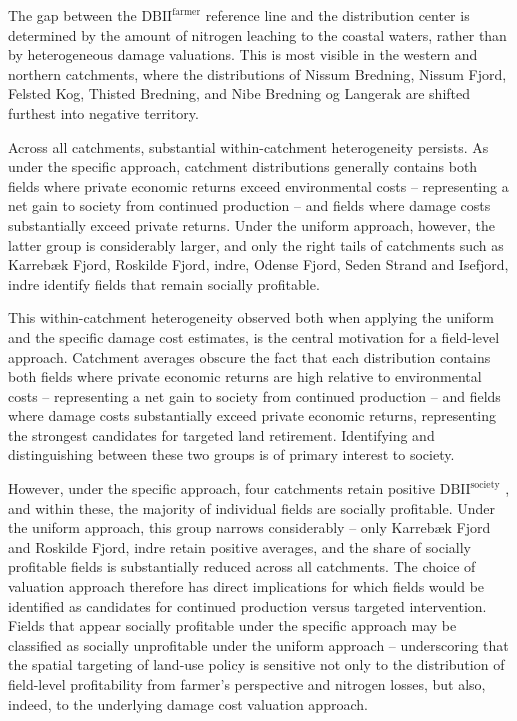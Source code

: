 \documentclass[12pt]{article}
\begin{document}
The gap between the $\mathrm{DBII^{farmer}}$ reference line and the distribution center is determined by the amount of nitrogen leaching to the coastal waters, rather than by heterogeneous damage valuations. This is most visible in the western and northern catchments, where the distributions of Nissum Bredning, Nissum Fjord, Felsted Kog, Thisted Bredning, and Nibe Bredning og Langerak are shifted furthest into negative territory.

Across all catchments, substantial within-catchment heterogeneity persists. 
As under the specific approach, catchment distributions generally contains both fields where private economic returns exceed environmental costs -- representing a net gain to society from continued production -- and fields where damage costs substantially exceed private returns. 
Under the uniform approach, however, the latter group is considerably larger, and only the right tails of catchments such as Karrebæk Fjord, Roskilde Fjord, indre, Odense Fjord, Seden Strand and Isefjord, indre identify fields that remain socially profitable.

This within-catchment heterogeneity observed both when applying the uniform and the specific damage cost estimates, is the central motivation for a field-level approach. Catchment averages obscure the fact that each distribution contains both fields where private economic returns are high relative to environmental costs -- representing a net gain to society from continued production -- and fields where damage costs substantially exceed private economic returns, representing the strongest candidates for targeted land retirement. 
Identifying and distinguishing between these two groups is of primary interest to society.

However, under the specific approach, four catchments retain positive $\mathrm{DBII^{society}}$ , and within these, the majority of individual fields are socially profitable. 
Under the uniform approach, this group narrows considerably -- only Karrebæk Fjord and Roskilde Fjord, indre retain positive averages, and the share of socially profitable fields is substantially reduced across all catchments. 
The choice of valuation approach therefore has direct implications for which fields would be identified as candidates for continued production versus targeted intervention. 
Fields that appear socially profitable under the specific approach may be classified as socially unprofitable under the uniform approach -- underscoring that the spatial targeting of land-use policy is sensitive not only to the distribution of field-level profitability from farmer's perspective and nitrogen losses, but also, indeed, to the underlying damage cost valuation approach. 
\end{document}
